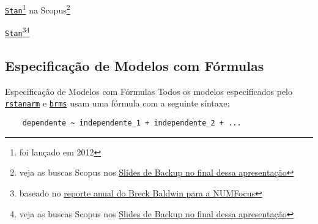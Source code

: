 \begin{frame}{\href{https://mc-stan.org}{\texttt{Stan}}\footnote{foi lançado em 2012} na Scopus\footnote{veja as buscas Scopus nos \hyperlink{appendixscopus}{Slides de Backup no final dessa apresentação}}}
    \centering
 \end{frame}

\begin{frame}{\href{https://mc-stan.org}{\texttt{Stan}}\footnote{baseado no \href{https://breckbaldwin.github.io/ScientificSoftwareImpactMetrics/DeepLearningAndBayesianSoftware.html}{reporte anual do Breck Baldwin para a NUMFocus}}\footnote{veja as buscas Scopus nos \hyperlink{appendixscopus}{Slides de Backup no final dessa apresentação}}}
    \centering
\end{frame}

\subsection{Especificação de Modelos com Fórmulas}
\begin{frame}[fragile]{Especificação de Modelos com Fórmulas}
    Todos os modelos especificados pelo \href{http://mc-stan.org/rstanarm/}{\texttt{rstanarm}}
    e \href{https://paul-buerkner.github.io/brms/}{\texttt{brms}} usam uma fórmula
    com a seguinte síntaxe:
    \vfill
    \begin{lstlisting}
    dependente ~ independente_1 + independente_2 + ...
    \end{lstlisting}
\end{frame}

